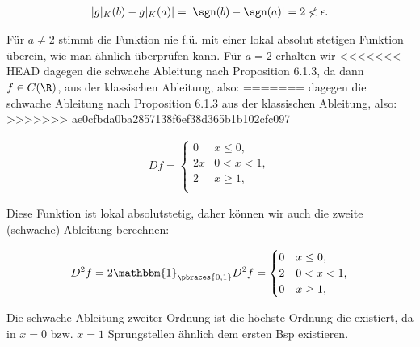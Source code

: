 \begin{solution}
\begin{align*}
  |g|_K(b) - g|_K(a)| = |\sgn(b) - \sgn(a)| = 2 \nless \epsilon.
\end{align*}

Für $a \neq 2$ stimmt die Funktion nie f.ü. mit einer lokal absolut stetigen
Funktion überein, wie man ähnlich überprüfen kann. Für $a=2$ erhalten wir
<<<<<<< HEAD
dagegen die schwache Ableitung nach Proposition 6.1.3, da dann $f\in C(\R)$,
aus der klassischen Ableitung, also:
=======
dagegen die schwache Ableitung nach Proposition 6.1.3 aus der klassischen
Ableitung, also:
>>>>>>> ae0cfbda0ba2857138f6ef38d365b1b102cfc097

\begin{align*}
  Df=
  \begin{cases}
  0 & x \leq 0, \\
  2x & 0 < x < 1, \\
  2 & x \geq 1, \\
  \end{cases}
\end{align*}

Diese Funktion ist lokal absolutstetig, daher können wir auch die zweite (schwache)
Ableitung berechnen:

\begin{align*}
  D^2f = 2 \mathbbm{1}_{\pbraces{0,1}}
  D^2f =
  \begin{cases}
    0 & x \leq 0,  \\
    2 & 0 < x < 1, \\
    0 & x \geq 1,
  \end{cases}
\end{align*}

Die schwache Ableitung zweiter Ordnung ist die höchste Ordnung die existiert,
da in $x=0$ bzw. $x=1$ Sprungstellen ähnlich dem ersten Bsp existieren.

\end{solution}
